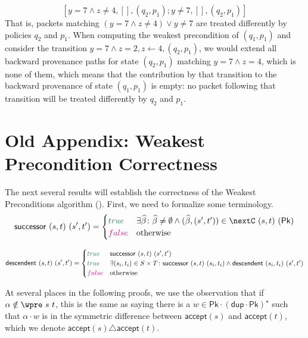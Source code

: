 \documentclass[acmsmall,dvipsnames,nonacm]{acmart}
\newcommand\false{\textcolor{magenta}{false}}
\newcommand\true{\textcolor{codegreen}{true}}
\newcommand\Pk{\mathsf{Pk}}
\newcommand\sympkp{\widehat\beta}
\newcommand\pk{\alpha}
\newcommand\dup{\mathsf{dup}}
\newcommand\accept{\mathsf{accept}}
\begin{document}
\[
  [y=7\wedge z\not=4, [],(q_2,p_1); y\not=7,[],(q_2,p_1)]
\]
That is, packets matching $(y=7\wedge z\not=4)\vee y\not=7$ are
treated differently by policies $q_2$ and $p_1$.  When computing the
weakest precondition of $(q_1,p_1)$ and consider the transition
$y=7\wedge z=2, z\gets4, (q_2,p_1)$, we would extend all backward
provenance paths for state $(q_2,p_1)$ matching $y=7\wedge z=4$, which
is none of them, which means that the contribution by that transition
to the backward provenance of state $(q_1,p_1)$ is empty: no packet
following that transition will be treated differently by $q_2$ and
$p_1$.

\section{Old Appendix: Weakest Precondition Correctness}

The next several results will establish the correctness of the Weakest
Preconditions algorithm ().
First, we need to formalize some terminology.
\[ \mathsf{successor}\ (s,t)\ (s',t') = \begin{cases}
    \true & \exists\sympkp\colon \sympkp\neq\emptyset \wedge (\sympkp, (s',t'))\in\nextC\ (s,t)\ (\Pk)\\
    \false & \text{otherwise}
\end{cases}
\]

\[ \mathsf{descendent}\ (s,t)\ (s',t') = \begin{cases}
    \true & \mathsf{successor}\ (s,t)\ (s',t')\\
    \true & \exists (s_i,t_i)\in S\times T\colon \mathsf{successor}\ (s,t)\ (s_i,t_i) \wedge \mathsf{descendent}\ (s_i,t_i)\ (s',t')\\
    \false & \text{otherwise}
\end{cases}
\]

At several places in the following proofs, we use the observation that if
$\pk\notin \wpre\ s\ t$, this is the same as saying there is a $w\in
\Pk\cdot(\dup\cdot\Pk)^\star$ such that $\pk\cdot w$ is in the symmetric
difference between $\accept(s)$ and $\accept(t)$, which we denote
$\accept(s) \triangle \accept(t)$.
\end{document}
